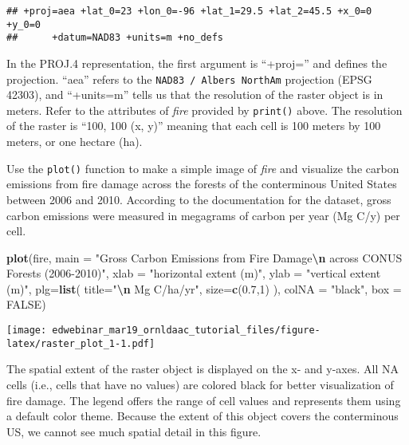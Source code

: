 \documentclass[
]{article}
\newenvironment{Shaded}{\begin{snugshade}}{\end{snugshade}}
\newcommand{\AttributeTok}[1]{\textcolor[rgb]{0.13,0.29,0.53}{#1}}
\newcommand{\ConstantTok}[1]{\textcolor[rgb]{0.56,0.35,0.01}{#1}}
\newcommand{\DecValTok}[1]{\textcolor[rgb]{0.00,0.00,0.81}{#1}}
\newcommand{\FloatTok}[1]{\textcolor[rgb]{0.00,0.00,0.81}{#1}}
\newcommand{\FunctionTok}[1]{\textcolor[rgb]{0.13,0.29,0.53}{\textbf{#1}}}
\newcommand{\NormalTok}[1]{#1}
\newcommand{\SpecialCharTok}[1]{\textcolor[rgb]{0.81,0.36,0.00}{\textbf{#1}}}
\newcommand{\StringTok}[1]{\textcolor[rgb]{0.31,0.60,0.02}{#1}}
\begin{document}
\begin{verbatim}
## +proj=aea +lat_0=23 +lon_0=-96 +lat_1=29.5 +lat_2=45.5 +x_0=0 +y_0=0
##      +datum=NAD83 +units=m +no_defs
\end{verbatim}

In the PROJ.4 representation, the first argument is ``+proj='' and
defines the projection. ``aea'' refers to the
\texttt{NAD83\ /\ Albers\ NorthAm} projection (EPSG 42303), and
``+units=m'' tells us that the resolution of the raster object is in
meters. Refer to the attributes of \emph{fire} provided by
\texttt{print()} above. The resolution of the raster is ``100, 100 (x,
y)'' meaning that each cell is 100 meters by 100 meters, or one hectare
(ha).

Use the \texttt{plot()} function to make a simple image of \emph{fire}
and visualize the carbon emissions from fire damage across the forests
of the conterminous United States between 2006 and 2010. According to
the documentation for the dataset, gross carbon emissions were measured
in megagrams of carbon per year (Mg C/y) per cell.

\begin{Shaded}
\begin{Highlighting}[]
\FunctionTok{plot}\NormalTok{(fire, }
     \AttributeTok{main =} \StringTok{"Gross Carbon Emissions from Fire Damage}\SpecialCharTok{\textbackslash{}n}\StringTok{ across CONUS Forests (2006{-}2010)"}\NormalTok{, }
     \AttributeTok{xlab =} \StringTok{"horizontal extent (m)"}\NormalTok{, }
     \AttributeTok{ylab =} \StringTok{"vertical extent (m)"}\NormalTok{, }
     \AttributeTok{plg=}\FunctionTok{list}\NormalTok{( }\AttributeTok{title=}\StringTok{"}\SpecialCharTok{\textbackslash{}n}\StringTok{      Mg C/ha/yr"}\NormalTok{, }\AttributeTok{size=}\FunctionTok{c}\NormalTok{(}\FloatTok{0.7}\NormalTok{,}\DecValTok{1}\NormalTok{) ),}
     \AttributeTok{colNA =} \StringTok{"black"}\NormalTok{, }
     \AttributeTok{box =} \ConstantTok{FALSE}\NormalTok{) }
\end{Highlighting}
\end{Shaded}

\texttt{[image: edwebinar\_mar19\_ornldaac\_tutorial\_files/figure-latex/raster\_plot\_1-1.pdf]}

The spatial extent of the raster object is displayed on the x- and
y-axes. All NA cells (i.e., cells that have no values) are colored black
for better visualization of fire damage. The legend offers the range of
cell values and represents them using a default color theme. Because the
extent of this object covers the conterminous US, we cannot see much
spatial detail in this figure.
\end{document}
